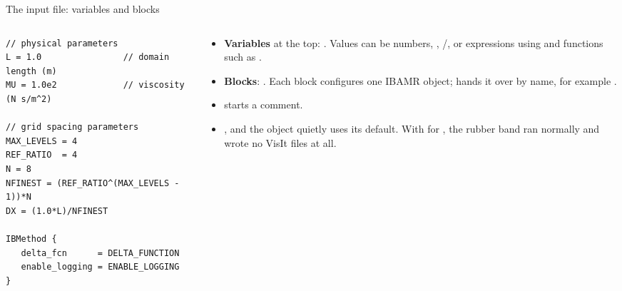 \documentclass[aspectratio=169,11pt]{beamer}
\begin{document}
\begin{frame}[fragile]{The input file: variables and blocks}
\begin{columns}[T,onlytextwidth]
\begin{column}{0.50\textwidth}
\begin{lstlisting}
// physical parameters
L = 1.0                // domain length (m)
MU = 1.0e2             // viscosity (N s/m^2)

// grid spacing parameters
MAX_LEVELS = 4
REF_RATIO  = 4
N = 8
NFINEST = (REF_RATIO^(MAX_LEVELS - 1))*N
DX = (1.0*L)/NFINEST

IBMethod {
   delta_fcn      = DELTA_FUNCTION
   enable_logging = ENABLE_LOGGING
}
\end{lstlisting}
\end{column}
\begin{column}{0.47\textwidth}
\begin{itemize}\small
  \item \textbf{Variables} at the top: . Values can be numbers, , /, or expressions using \code{+ - * / \^{}} and functions such as .
  \item \textbf{Blocks}: . Each block configures one IBAMR object;  hands it over by name, for example .
  \item \code{//} starts a comment.
  \item {}, and the object quietly uses its default. With  for , the rubber band ran normally and wrote no VisIt files at all.
\end{itemize}
\end{column}
\end{columns}
\end{frame}
\end{document}

